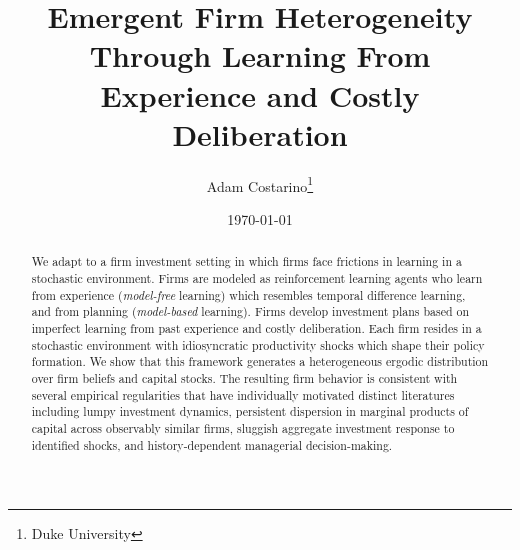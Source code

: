 \documentclass{working-paper}
\title{Emergent Firm Heterogeneity Through Learning From Experience and Costly Deliberation}
\author{Adam Costarino\thanks{Duke University}}
\date{\today}
\begin{document}
\begin{titlepage}
\maketitle
\begin{abstract}
We adapt \cite{IlutValchev2023} to a firm investment setting in which firms face
frictions in learning in a stochastic environment. Firms are modeled as reinforcement 
learning agents who learn from experience (\textit{model-free} learning) which 
resembles temporal difference learning, and from planning (\textit{model-based} learning).
Firms develop investment plans based on imperfect learning from past experience and costly 
deliberation. Each firm resides in a stochastic environment with idiosyncratic 
productivity shocks which shape their policy formation. We show that this framework 
generates a heterogeneous ergodic distribution over firm beliefs and capital stocks. 
The resulting firm behavior is consistent with several empirical regularities that have 
individually motivated distinct literatures including lumpy investment dynamics, 
persistent dispersion in marginal products of capital across observably similar firms, 
sluggish aggregate investment response to identified shocks, and history-dependent 
managerial decision-making.
\end{abstract}

\vspace{1em}
\vspace{0.5em}
\setcounter{page}{0}
\thispagestyle{empty}
\end{titlepage}
\clearpage
\tableofcontents
\clearpage






\appendix

\newpage







\end{document}
